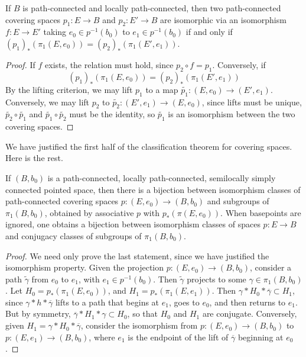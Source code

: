 \begin{theorem}
    If $B$ is path-connected and locally path-connected, then two path-connected covering spaces $p_1: E \to B$ and $p_2: E' \to B$ are isomorphic via an isomorphism $f: E \to E'$ taking $e_0 \in p^{-1}(b_0)$ to $e_1 \in p^{-1}(b_0)$ if and only if $(p_1)_*(\pi_1(E,e_0)) = (p_2)_*(\pi_1(E',e_1))$.
\end{theorem}
\begin{proof}
    If $f$ exists, the relation must hold, since $p_2 \circ f = p_1$. Conversely, if
    \[ (p_1)_*(\pi_1(E,e_0)) = (p_2)_*(\pi_1(E',e_1)) \]
    By the lifting criterion, we may lift $p_1$ to a map $\tilde{p_1}: (E,e_0) \to (E',e_1)$. Conversely, we may lift $p_2$ to $\tilde{p_2}: (E', e_1) \to (E,e_0)$, since lifts must be unique, $\tilde{p_2} \circ \tilde{p_1}$ and $\tilde{p_1} \circ \tilde{p_2}$ must be the identity, so $\tilde{p_1}$ is an isomorphism between the two covering spaces.
\end{proof}

We have justified the first half of the classification theorem for covering spaces. Here is the rest.

\begin{theorem}
    If $(B,b_0)$ is a path-connected, locally path-connected, semilocally simply connected pointed space, then there is a bijection between isomorphism classes of path-connected covering spaces $p: (E,e_0) \to (B,b_0)$ and subgroups of $\pi_1(B,b_0)$, obtained by associative $p$ with $p_*(\pi(E,e_0))$. When basepoints are ignored, one obtains a bijection between isomorphism classes of spaces $p: E \to B$ and conjugacy classes of subgroups of $\pi_1(B,b_0)$.
\end{theorem}
\begin{proof}
    We need only prove the last statement, since we have justified the isomorphism property. Given the projection $p: (E,e_0) \to (B,b_0)$, consider a path $\tilde{\gamma}$ from $e_0$ to $e_1$, with $e_1 \in p^{-1}(b_0)$. Then $\tilde{\gamma}$ projects to some $\gamma \in \pi_1(B,b_0)$. Let $H_0 = p_*(\pi_1(E,e_0))$, and $H_1 = p_*(\pi_1(E,e_1))$. Then $\gamma * H_0 * \overline{\gamma} \subset H_1$, since $\gamma * h * \overline{\gamma}$ lifts to a path that begins at $e_1$, goes to $e_0$, and then returns to $e_1$. But by symmetry, $\overline{\gamma} * H_1 * \gamma \subset H_0$, so that $H_0$ and $H_1$ are conjugate. Conversely, given $H_1 = \gamma * H_0 * \overline{\gamma}$, consider the isomorphism from $p: (E,e_0) \to (B,b_0)$ to $p: (E,e_1) \to (B,b_0)$, where $e_1$ is the endpoint of the lift of $\overline{\gamma}$ beginning at $e_0$.
\end{proof}

